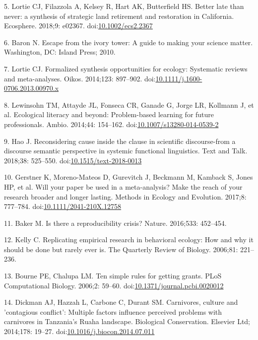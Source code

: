 \documentclass[10pt,letterpaper]{article}
\begin{document}
\hypertarget{ref-Lortie2018}{}
5. Lortie CJ, Filazzola A, Kelsey R, Hart AK, Butterfield HS. Better
late than never: a synthesis of strategic land retirement and
restoration in California. Ecosphere. 2018;9: e02367.
doi:\href{https://doi.org/10.1002/ecs2.2367}{10.1002/ecs2.2367}

\hypertarget{ref-Baron2010}{}
6. Baron N. Escape from the ivory tower: A guide to making your science
matter. Washington, DC: Island Press; 2010.

\hypertarget{ref-Lortie2014}{}
7. Lortie CJ. Formalized synthesis opportunities for ecology: Systematic
reviews and meta-analyses. Oikos. 2014;123: 897--902.
doi:\href{https://doi.org/10.1111/j.1600-0706.2013.00970.x}{10.1111/j.1600-0706.2013.00970.x}

\hypertarget{ref-Lewinsohn2014}{}
8. Lewinsohn TM, Attayde JL, Fonseca CR, Ganade G, Jorge LR, Kollmann J,
et al. Ecological literacy and beyond: Problem-based learning for future
professionals. Ambio. 2014;44: 154--162.
doi:\href{https://doi.org/10.1007/s13280-014-0539-2}{10.1007/s13280-014-0539-2}

\hypertarget{ref-Hao2018}{}
9. Hao J. Reconsidering cause inside the clause in scientific
discourse-from a discourse semantic perspective in systemic functional
linguistics. Text and Talk. 2018;38: 525--550.
doi:\href{https://doi.org/10.1515/text-2018-0013}{10.1515/text-2018-0013}

\hypertarget{ref-Gerstner2017}{}
10. Gerstner K, Moreno-Mateos D, Gurevitch J, Beckmann M, Kamback S,
Jones HP, et al. Will your paper be used in a meta-analysis? Make the
reach of your research broader and longer lasting. Methods in Ecology
and Evolution. 2017;8: 777--784.
doi:\href{https://doi.org/10.1111/2041-210X.12758}{10.1111/2041-210X.12758}

\hypertarget{ref-Baker2016}{}
11. Baker M. Is there a reproducibility crisis? Nature. 2016;533:
452--454.

\hypertarget{ref-Kelly2006}{}
12. Kelly C. Replicating empirical research in behavioral ecology: How
and why it should be done but rarely ever is. The Quarterly Review of
Biology. 2006;81: 221--236.

\hypertarget{ref-Bourne2006}{}
13. Bourne PE, Chalupa LM. Ten simple rules for getting grants. PLoS
Computational Biology. 2006;2: 59--60.
doi:\href{https://doi.org/10.1371/journal.pcbi.0020012}{10.1371/journal.pcbi.0020012}

\hypertarget{ref-Dickman2014}{}
14. Dickman AJ, Hazzah L, Carbone C, Durant SM. Carnivores, culture and
'contagious conflict': Multiple factors influence perceived problems
with carnivores in Tanzania's Ruaha landscape. Biological Conservation.
Elsevier Ltd; 2014;178: 19--27.
doi:\href{https://doi.org/10.1016/j.biocon.2014.07.011}{10.1016/j.biocon.2014.07.011}
\end{document}
